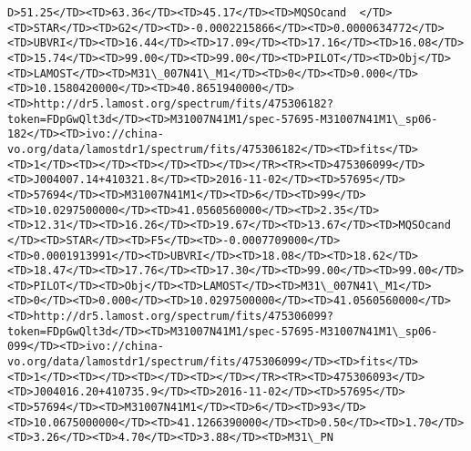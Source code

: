 \documentclass[11pt]{article}
\begin{document}
\begin{Verbatim}[commandchars=\\\{\}]
D>51.25</TD><TD>63.36</TD><TD>45.17</TD><TD>MQSOcand  </TD><TD>STAR</TD><TD>G2</TD><TD>-0.0002215866</TD><TD>0.0000634772</TD><TD>UBVRI</TD><TD>16.44</TD><TD>17.09</TD><TD>17.16</TD><TD>16.08</TD><TD>15.74</TD><TD>99.00</TD><TD>99.00</TD><TD>PILOT</TD><TD>Obj</TD><TD>LAMOST</TD><TD>M31\_007N41\_M1</TD><TD>0</TD><TD>0.000</TD><TD>10.1580420000</TD><TD>40.8651940000</TD><TD>http://dr5.lamost.org/spectrum/fits/475306182?token=FDpGwQlt3d</TD><TD>M31007N41M1/spec-57695-M31007N41M1\_sp06-182</TD><TD>ivo://china-vo.org/data/lamostdr1/spectrum/fits/475306182</TD><TD>fits</TD><TD>1</TD><TD></TD><TD></TD><TD></TD></TR><TR><TD>475306099</TD><TD>J004007.14+410321.8</TD><TD>2016-11-02</TD><TD>57695</TD><TD>57694</TD><TD>M31007N41M1</TD><TD>6</TD><TD>99</TD><TD>10.0297500000</TD><TD>41.0560560000</TD><TD>2.35</TD><TD>12.31</TD><TD>16.26</TD><TD>19.67</TD><TD>13.67</TD><TD>MQSOcand  </TD><TD>STAR</TD><TD>F5</TD><TD>-0.0007709000</TD><TD>0.0001913991</TD><TD>UBVRI</TD><TD>18.08</TD><TD>18.62</TD><TD>18.47</TD><TD>17.76</TD><TD>17.30</TD><TD>99.00</TD><TD>99.00</TD><TD>PILOT</TD><TD>Obj</TD><TD>LAMOST</TD><TD>M31\_007N41\_M1</TD><TD>0</TD><TD>0.000</TD><TD>10.0297500000</TD><TD>41.0560560000</TD><TD>http://dr5.lamost.org/spectrum/fits/475306099?token=FDpGwQlt3d</TD><TD>M31007N41M1/spec-57695-M31007N41M1\_sp06-099</TD><TD>ivo://china-vo.org/data/lamostdr1/spectrum/fits/475306099</TD><TD>fits</TD><TD>1</TD><TD></TD><TD></TD><TD></TD></TR><TR><TD>475306093</TD><TD>J004016.20+410735.9</TD><TD>2016-11-02</TD><TD>57695</TD><TD>57694</TD><TD>M31007N41M1</TD><TD>6</TD><TD>93</TD><TD>10.0675000000</TD><TD>41.1266390000</TD><TD>0.50</TD><TD>1.70</TD><TD>3.26</TD><TD>4.70</TD><TD>3.88</TD><TD>M31\_PN    
\end{Verbatim}
\end{document}
